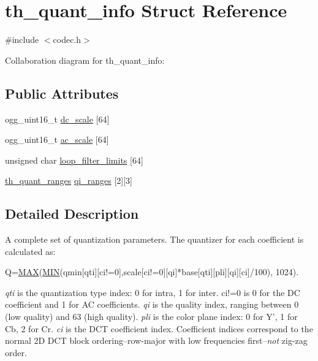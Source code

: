 \hypertarget{structth__quant__info}{\section{th\+\_\+quant\+\_\+info Struct Reference}
\label{structth__quant__info}
}


{\ttfamily \#include $<$codec.\+h$>$}



Collaboration diagram for th\+\_\+quant\+\_\+info\+:
\subsection*{Public Attributes}
\begin{DoxyCompactItemize}
\item 
ogg\+\_\+uint16\+\_\+t \hyperlink{structth__quant__info_ad5c1c0d1aa4127fcf864ae747d732ed9}{dc\+\_\+scale} \mbox{[}64\mbox{]}
\item 
ogg\+\_\+uint16\+\_\+t \hyperlink{structth__quant__info_a102f079c8f4a135dc0895c10768aeb06}{ac\+\_\+scale} \mbox{[}64\mbox{]}
\item 
unsigned char \hyperlink{structth__quant__info_a4ac56bf0a45b5743b36daf85d5cd9e33}{loop\+\_\+filter\+\_\+limits} \mbox{[}64\mbox{]}
\item 
\hyperlink{structth__quant__ranges}{th\+\_\+quant\+\_\+ranges} \hyperlink{structth__quant__info_a6feacf4b365e305a7df7b93d87ee7bb8}{qi\+\_\+ranges} \mbox{[}2\mbox{]}\mbox{[}3\mbox{]}
\end{DoxyCompactItemize}


\subsection{Detailed Description}
A complete set of quantization parameters. The quantizer for each coefficient is calculated as\+: 
\begin{DoxyCode}
Q=\hyperlink{_ice_types_8h_afa99ec4acc4ecb2dc3c2d05da15d0e3f}{MAX}(\hyperlink{_ice_types_8h_a3acffbd305ee72dcd4593c0d8af64a4f}{MIN}(qmin[qti][ci!=0],scale[ci!=0][qi]*base[qti][pli][qi][ci]/100),
 1024).
\end{DoxyCode}


{\itshape qti} is the quantization type index\+: 0 for intra, 1 for inter. {\ttfamily ci!=0} is 0 for the D\+C coefficient and 1 for A\+C coefficients. {\itshape qi} is the quality index, ranging between 0 (low quality) and 63 (high quality). {\itshape pli} is the color plane index\+: 0 for Y', 1 for Cb, 2 for Cr. {\itshape ci} is the D\+C\+T coefficient index. Coefficient indices correspond to the normal 2\+D D\+C\+T block ordering--row-\/major with low frequencies first--{\itshape not} zig-\/zag order.

